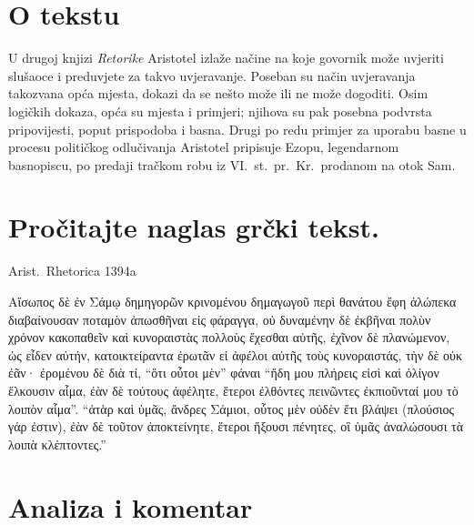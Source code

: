 
\section*{O tekstu}

U drugoj knjizi \textit{Retorike} Aristotel izlaže načine na koje govornik može uvjeriti slušaoce i preduvjete za takvo uvjeravanje. Poseban su način uvjeravanja takozvana opća mjesta, dokazi da se nešto može ili ne može dogoditi. Osim logičkih dokaza, opća su mjesta i primjeri; njihova su pak posebna podvrsta pripovijesti, poput prispodoba i basna. Drugi po redu primjer za uporabu basne u procesu političkog odlučivanja Aristotel pripisuje Ezopu, legendarnom basnopiscu, po predaji tračkom robu iz VI.~st.\ pr.~Kr.\ prodanom na otok Sam.


\section*{Pročitajte naglas grčki tekst.}

Arist.\ Rhetorica 1394a
\medskip

{\large
\begin{greek}
\noindent Αἴσωπος δὲ ἐν Σάμῳ δημηγορῶν κρινομένου δημαγωγοῦ περὶ θανάτου ἔφη ἀλώπεκα διαβαίνουσαν ποταμὸν ἀπωσθῆναι εἰς φάραγγα, οὐ δυναμένην δὲ ἐκβῆναι πολὺν χρόνον κακοπαθεῖν καὶ κυνοραιστὰς πολλοὺς ἔχεσθαι αὐτῆς, ἐχῖνον δὲ πλανώμενον, ὡς εἶδεν αὐτήν, κατοικτείραντα ἐρωτᾶν εἰ ἀφέλοι αὐτῆς τοὺς κυνοραιστάς, τὴν δὲ οὐκ ἐᾶν· ἐρομένου δὲ διὰ τί, ``ὅτι οὗτοι μὲν'' φάναι ``ἤδη μου πλήρεις εἰσὶ καὶ ὀλίγον ἕλκουσιν αἷμα, ἐὰν δὲ τούτους ἀφέλητε, ἕτεροι ἐλθόντες πεινῶντες ἐκπιοῦνταί μου τὸ λοιπὸν αἷμα''. ``ἀτὰρ καὶ ὑμᾶς, ἄνδρες Σάμιοι, οὗτος μὲν οὐδὲν ἔτι βλάψει (πλούσιος γάρ ἐστιν), ἐὰν δὲ τοῦτον ἀποκτείνητε, ἕτεροι ἥξουσι πένητες, οἳ ὑμᾶς ἀναλώσουσι τὰ λοιπὰ κλέπτοντες.''

\end{greek}
}

\newpage

\section*{Analiza i komentar}


